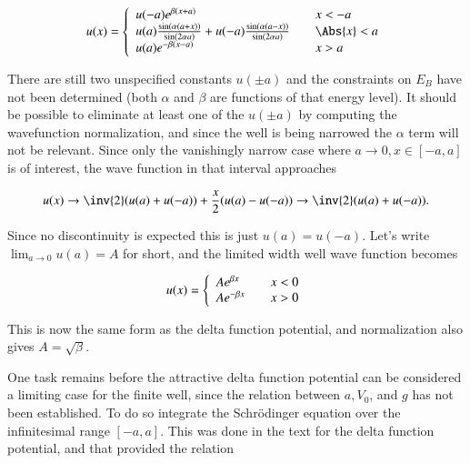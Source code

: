 \begin{equation}\label{eqn:qmIproblemSet4:140}
u(x) =
\left\{
\begin{array}{l l}
u(-a) e^{\beta(x+a)}
 & \quad \mbox{$x < -a$} \\
u(a) \frac{\sin(\alpha (a + x))}{\sin(2 \alpha a)} +
u(-a) \frac{\sin(\alpha (a - x))}{\sin(2 \alpha a)}
 & \quad \mbox{$\Abs{x} < a$} \\
u(a) e^{-\beta(x-a)}
 & \quad \mbox{$x > a$} \\
\end{array}
\right.
\end{equation}

There are still two unspecified constants $u(\pm a)$ and the constraints on $E_B$ have not been determined (both $\alpha$ and $\beta$ are functions of that energy level).  It should be possible to eliminate at least one of the $u(\pm a)$ by computing the wavefunction normalization, and since the well is being narrowed the $\alpha$ term will not be relevant.  Since only the vanishingly narrow case where $a \rightarrow 0, x \in [-a,a]$ is of interest, the wave function in that interval approaches

\begin{equation}\label{eqn:qmIproblemSet4:145}
u(x) \rightarrow \inv{2} (u(a) + u(-a)) + \frac{x}{2} ( u(a) - u(-a) ) \rightarrow \inv{2} (u(a) + u(-a)).
\end{equation}

Since no discontinuity is expected this is just $u(a) = u(-a)$.  Let's write $\lim_{a\rightarrow 0} u(a) = A$ for short, and the limited width well wave function becomes

\begin{equation}\label{eqn:qmIproblemSet4:150}
u(x) =
\left\{
\begin{array}{l l}
A e^{\beta x}
 & \quad \mbox{$x < 0$} \\
A e^{-\beta x}
 & \quad \mbox{$x > 0$} \\
\end{array}
\right.
\end{equation}

This is now the same form as the delta function potential, and normalization also gives $A = \sqrt{\beta}$.

One task remains before the attractive delta function potential can be considered a limiting case for the finite well, since the relation between $a, V_0$, and $g$ has not been established.  To do so integrate the Schr\"{o}dinger equation over the infinitesimal range $[-a,a]$.  This was done in the text for the delta function potential, and that provided the relation

